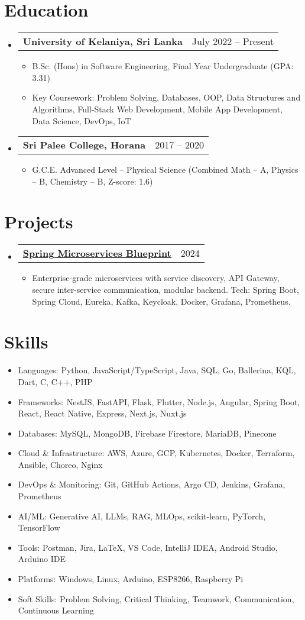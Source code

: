 \documentclass[letterpaper,11pt]{article} %
\makeatletter
\newcommand{\resumeItem}[1]{
  \item\small{#1 \vspace{-2pt}}
}
\newcommand{\resumeCustomSubheading}[2]{ %
  \vspace{2pt}\item
  \begin{tabular*}{0.97\textwidth}[t]{l@{\extracolsep{\fill}}r}
    \textbf{#1} & #2 \\
  \end{tabular*}\vspace{-3pt}
}
\newcommand{\resumeProjectHeading}[2]{ %
  \item
  \begin{tabular*}{0.97\textwidth}{l@{\extracolsep{\fill}}r}
    \small#1 & #2 \\
  \end{tabular*}\vspace{-7pt}
}
\newcommand{\resumeSubHeadingListStart}{\begin{itemize}[leftmargin=0.15in, label={}]}
\newcommand{\resumeSubHeadingListEnd}{\end{itemize}}
\newcommand{\resumeItemListStart}{\begin{itemize}}
\newcommand{\resumeItemListEnd}{\end{itemize}\vspace{-5pt}}
\makeatother
\begin{document}
\section{Education}
\resumeSubHeadingListStart
    \resumeCustomSubheading
      {University of Kelaniya, Sri Lanka}{July 2022 -- Present}
      \resumeItemListStart
        \resumeItem{B.Sc. (Hons) in Software Engineering, Final Year Undergraduate (GPA: 3.31)}
        \resumeItem{Key Coursework: Problem Solving, Databases, OOP, Data Structures and Algorithms, Full-Stack Web Development, Mobile App Development, Data Science, DevOps, IoT}
      \resumeItemListEnd

    \resumeCustomSubheading
      {Sri Palee College, Horana}{2017 -- 2020}
      \resumeItemListStart
        \resumeItem{G.C.E. Advanced Level – Physical Science (Combined Math – A, Physics – B, Chemistry – B, Z-score: 1.6)}
      \resumeItemListEnd
\resumeSubHeadingListEnd

\section{Projects}
\resumeSubHeadingListStart
    \resumeProjectHeading
      {\textbf{\underline{\href{https://github.com/vipunsanjana/Spring-Microservices-Complete-Blueprint}{Spring Microservices Blueprint}}}}{2024}
      \resumeItemListStart
        \resumeItem{Enterprise-grade microservices with service discovery, API Gateway, secure inter-service communication, modular backend. Tech: Spring Boot, Spring Cloud, Eureka, Kafka, Keycloak, Docker, Grafana, Prometheus.}
      \resumeItemListEnd
\resumeSubHeadingListEnd

\section{Skills}
\resumeItemListStart
  \resumeItem{Languages: Python, JavaScript/TypeScript, Java, SQL, Go, Ballerina, KQL, Dart, C, C++, PHP}
  \resumeItem{Frameworks: NestJS, FastAPI, Flask, Flutter, Node.js, Angular, Spring Boot, React, React Native, Express, Next.js, Nuxt.js}
  \resumeItem{Databases: MySQL, MongoDB, Firebase Firestore, MariaDB, Pinecone}
  \resumeItem{Cloud & Infrastructure: AWS, Azure, GCP, Kubernetes, Docker, Terraform, Ansible, Choreo, Nginx}
  \resumeItem{DevOps & Monitoring: Git, GitHub Actions, Argo CD, Jenkins, Grafana, Prometheus}
  \resumeItem{AI/ML: Generative AI, LLMs, RAG, MLOps, scikit-learn, PyTorch, TensorFlow}
  \resumeItem{Tools: Postman, Jira, LaTeX, VS Code, IntelliJ IDEA, Android Studio, Arduino IDE}
  \resumeItem{Platforms: Windows, Linux, Arduino, ESP8266, Raspberry Pi}
  \resumeItem{Soft Skills: Problem Solving, Critical Thinking, Teamwork, Communication, Continuous Learning}
\resumeItemListEnd

\end{document}

